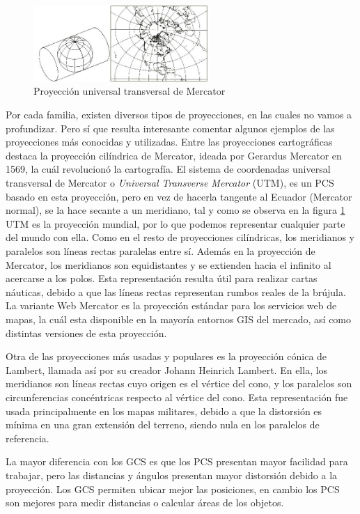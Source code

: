 \begin{figure}[H]
  \centering
  \includegraphics[width=0.60\textwidth]{Imagenes/CRS/utm.jpg}
  \caption{Proyección universal transversal de Mercator} \label{fig:UTM}
\end{figure}
Por cada familia, existen diversos tipos de proyecciones, en las cuales no vamos a profundizar. Pero sí que resulta interesante comentar algunos ejemplos de las proyecciones más conocidas y utilizadas.
Entre las proyecciones cartográficas destaca la proyección cilíndrica de Mercator, ideada por Gerardus Mercator en 1569, la cuál revolucionó la cartografía. 
El sistema de coordenadas universal transversal de Mercator o \textit{Universal Transverse Mercator} (UTM), es un PCS basado en esta proyección, 
pero en vez de hacerla tangente al Ecuador (Mercator normal), se la hace secante a un meridiano, tal y como se observa en la figura \ref{fig:UTM}
UTM es la proyección mundial, por lo que podemos representar cualquier parte del mundo con ella.
Como en el resto de proyecciones cilíndricas, los meridianos y paralelos son líneas rectas paralelas entre sí. Además en la proyección de Mercator, los meridianos son equidistantes y se extienden hacia el infinito al acercarse a los polos.
Esta representación resulta útil para realizar cartas náuticas, debido a que las líneas rectas representan rumbos reales de la brújula.
La variante Web Mercator es la proyección estándar para los servicios web de mapas, la cuál esta disponible en la mayoría entornos GIS del mercado, así como distintas versiones de esta proyección.

Otra de las proyecciones más usadas y populares es la proyección cónica de Lambert, llamada así por su creador Johann Heinrich Lambert. 
En ella, los meridianos son líneas rectas cuyo origen es el vértice del cono, y los paralelos son circunferencias concéntricas respecto al vértice del cono.
Esta representación fue usada principalmente en los mapas militares, debido a que la distorsión es mínima en una gran extensión del terreno, siendo nula en los paralelos de referencia.

La mayor diferencia con los GCS es que los PCS presentan mayor facilidad para trabajar, pero las distancias y ángulos presentan mayor distorsión debido a la proyección.
Los GCS permiten ubicar mejor las posiciones, en cambio los PCS son mejores para medir distancias o calcular áreas de los objetos.

